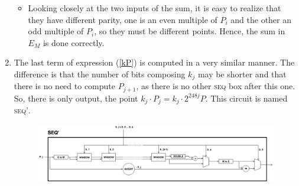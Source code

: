 \begin{enumerate}
\begin{itemize}
		\item Looking closely at the two inputs of the sum, it is easy to realize that they have different parity, one is an even multiple of $P_i$ and the other an odd multiple of $P_i$, so they must be different points. Hence, the sum in $E_M$ is done correctly.
	\end{itemize}
	
	\item The last term of expression (\ref{kP}) is computed in a very similar manner. The difference is that the number of bits composing $k_j$ may be shorter and that there is no need to compute $P_{j+1}$, as there is no other \textsc{seq} box after this one. So, there is only output, the point $k_j \cdot P_j = k_j\cdot 2^{248j} P$. This circuit is named \textsc{seq'}.
	
	\begin{figure}[h]
		\centering
		\includegraphics[scale=0.43]{figures/multiplication-SEQ-prime.png}
	\end{figure}
	
\end{enumerate}
